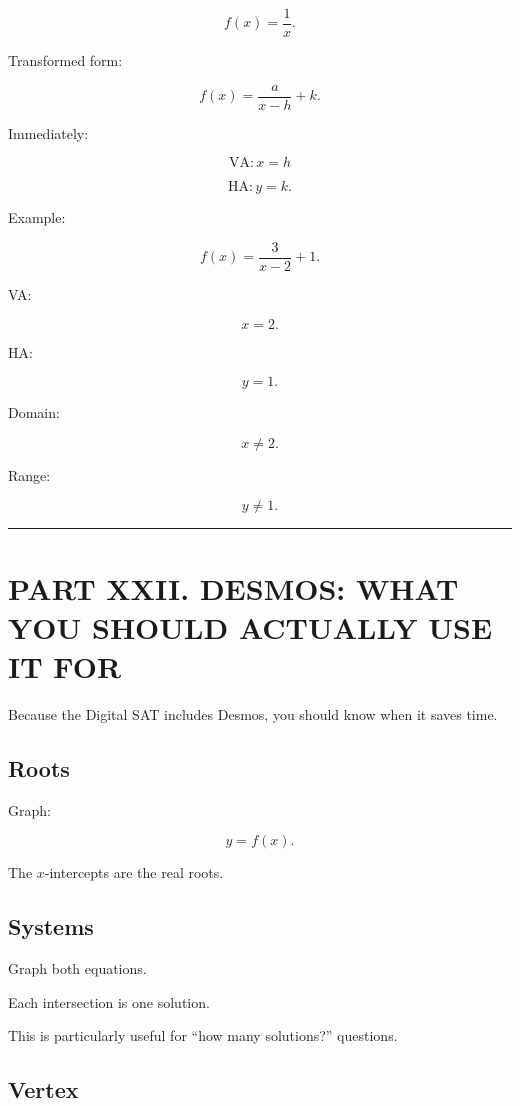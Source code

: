 \documentclass[
]{article}
\begin{document}
\[
\boxed{f(x)=\frac1x}.
\]

Transformed form:

\[
\boxed{f(x)=\frac a{x-h}+k}.
\]

Immediately:

\[
\boxed{\text{VA}:x=h}
\]

\[
\boxed{\text{HA}:y=k}.
\]

Example:

\[
f(x)=\frac3{x-2}+1.
\]

VA:

\[
x=2.
\]

HA:

\[
y=1.
\]

Domain:

\[
x\neq2.
\]

Range:

\[
y\neq1.
\]

\begin{center}\rule{0.5\linewidth}{0.5pt}\end{center}

\section{PART XXII. DESMOS: WHAT YOU SHOULD ACTUALLY USE IT
FOR}\label{part-xxii.-desmos-what-you-should-actually-use-it-for}

Because the Digital SAT includes Desmos, you should know when it saves
time.

\subsection{Roots}\label{roots}

Graph:

\[
y=f(x).
\]

The \(x\)-intercepts are the real roots.

\subsection{Systems}\label{systems}

Graph both equations.

Each intersection is one solution.

This is particularly useful for ``how many solutions?'' questions.

\subsection{Vertex}\label{vertex}
\end{document}
